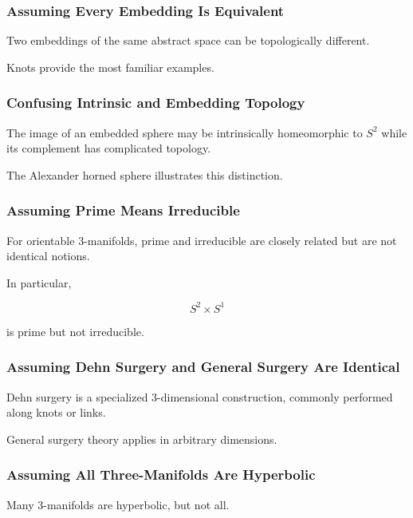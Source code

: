 \subsubsection{Assuming Every Embedding Is Equivalent}

Two embeddings of the same abstract space can be topologically different.

Knots provide the most familiar examples.

\subsubsection{Confusing Intrinsic and Embedding Topology}

The image of an embedded sphere may be intrinsically homeomorphic to
\(S^2\) while its complement has complicated topology.

The Alexander horned sphere illustrates this distinction.

\subsubsection{Assuming Prime Means Irreducible}

For orientable \(3\)-manifolds, prime and irreducible are closely related
but are not identical notions.

In particular,

\[
S^2\times S^1
\]

is prime but not irreducible.

\subsubsection{Assuming Dehn Surgery and General Surgery Are Identical}

Dehn surgery is a specialized \(3\)-dimensional construction, commonly
performed along knots or links.

General surgery theory applies in arbitrary dimensions.

\subsubsection{Assuming All Three-Manifolds Are Hyperbolic}

Many \(3\)-manifolds are hyperbolic, but not all.

